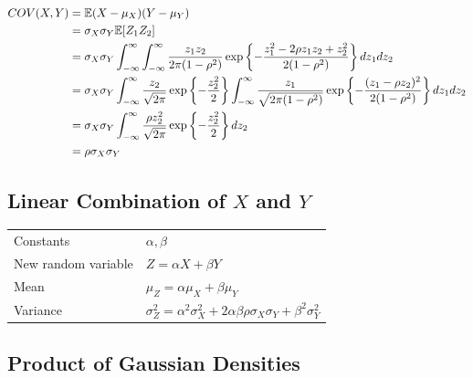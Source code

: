 \[
\begin{aligned}
    COV(X,Y)
    &= \mathbb{E}(X - \mu_X)(Y - \mu_Y) \\
    &= \sigma_X \sigma_Y \mathbb{E}[Z_1Z_2] \\
    &= \sigma_X \sigma_Y \displaystyle\int_{-\infty}^{\infty}
        \displaystyle\int_{-\infty}^{\infty} 
        \dfrac{z_1 z_2}{2\pi (1 - \rho^2)}
        \exp\left\{ 
            -\dfrac{z_1^2 - 2\rho z_1 z_2 + z_2^2}{2(1-\rho^2)}
        \right\}
        dz_1 dz_2 \\
    &= \sigma_X \sigma_Y 
        \displaystyle\int_{-\infty}^{\infty} \dfrac{z_2}{\sqrt{2\pi}}
        \exp \left\{- \dfrac{z_2^2}{2}\right\}
        \displaystyle\int_{-\infty}^{\infty}
        \dfrac{z_1}{\sqrt{2\pi(1-\rho^2)}}
        \exp \left\{ -\dfrac{(z_1 - \rho z_2)^2}{2(1- \rho^2)}\right\} dz_1 dz_2 \\
    &= \sigma_X \sigma_Y \displaystyle\int_{-\infty}^{\infty}
        \dfrac{\rho z_2^2}{\sqrt{2\pi}}
        \exp \left\{- \dfrac{z_2^2}{2}\right\} d z_2 \\
    &= \rho \sigma_X \sigma_Y
\end{aligned}
\]


\subsection{Linear Combination of $X$ and $Y$ \cite{ism-1}} \label{Normal distribution: Bivariate/ Multivariate: linear combination}

\begin{table}[H]
    \centering
    \begin{tabular}{l l}
        Constants & $\alpha, \beta$ \\
    
        New random variable & $Z = \alpha X + \beta Y$ \\

        Mean & $\mu_Z = \alpha \mu_X + \beta \mu_Y$ \\

        Variance & $
            \sigma_Z^2 
            = \alpha^2 \sigma^2_X 
            + 2\alpha\beta\rho\sigma_X\sigma_Y 
            + \beta^2 \sigma^2_Y
        $ \\

    \end{tabular}

\end{table}


\subsection{Product of Gaussian Densities \cite{mfml-1}}\label{Product of Gaussian Densities}

